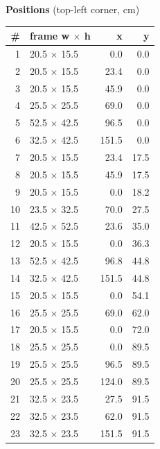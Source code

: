 \documentclass[a4paper,landscape,10pt]{article}
\begin{document}
\begin{minipage}[t]{0.25\textwidth}
\vspace{8pt}
{\bfseries Positions} (top-left corner, cm)\\[2pt]
\tiny
\begin{tabular}{@{}r l r r@{}}
\toprule
\# & frame w $\times$ h & x & y \\
\midrule
1 & 20.5 $\times$ 15.5 & 0.0 & 0.0 \\
2 & 20.5 $\times$ 15.5 & 23.4 & 0.0 \\
3 & 20.5 $\times$ 15.5 & 45.9 & 0.0 \\
4 & 25.5 $\times$ 25.5 & 69.0 & 0.0 \\
5 & 52.5 $\times$ 42.5 & 96.5 & 0.0 \\
6 & 32.5 $\times$ 42.5 & 151.5 & 0.0 \\
7 & 20.5 $\times$ 15.5 & 23.4 & 17.5 \\
8 & 20.5 $\times$ 15.5 & 45.9 & 17.5 \\
9 & 20.5 $\times$ 15.5 & 0.0 & 18.2 \\
10 & 23.5 $\times$ 32.5 & 70.0 & 27.5 \\
11 & 42.5 $\times$ 52.5 & 23.6 & 35.0 \\
12 & 20.5 $\times$ 15.5 & 0.0 & 36.3 \\
13 & 52.5 $\times$ 42.5 & 96.8 & 44.8 \\
14 & 32.5 $\times$ 42.5 & 151.5 & 44.8 \\
15 & 20.5 $\times$ 15.5 & 0.0 & 54.1 \\
16 & 25.5 $\times$ 25.5 & 69.0 & 62.0 \\
17 & 20.5 $\times$ 15.5 & 0.0 & 72.0 \\
18 & 25.5 $\times$ 25.5 & 0.0 & 89.5 \\
19 & 25.5 $\times$ 25.5 & 96.5 & 89.5 \\
20 & 25.5 $\times$ 25.5 & 124.0 & 89.5 \\
21 & 32.5 $\times$ 23.5 & 27.5 & 91.5 \\
22 & 32.5 $\times$ 23.5 & 62.0 & 91.5 \\
23 & 32.5 $\times$ 23.5 & 151.5 & 91.5 \\
\bottomrule
\end{tabular}
\end{minipage}
\clearpage
\end{document}

